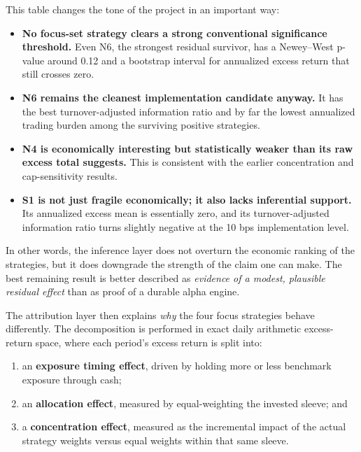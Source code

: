 \documentclass[conference]{IEEEtran}
\begin{document}
This table changes the tone of the project in an important way:
\begin{itemize}[leftmargin=1.4em]
    \item \textbf{No focus-set strategy clears a strong conventional significance threshold.} Even N6, the strongest residual survivor, has a Newey--West p-value around 0.12 and a bootstrap interval for annualized excess return that still crosses zero.
    \item \textbf{N6 remains the cleanest implementation candidate anyway.} It has the best turnover-adjusted information ratio and by far the lowest annualized trading burden among the surviving positive strategies.
    \item \textbf{N4 is economically interesting but statistically weaker than its raw excess total suggests.} This is consistent with the earlier concentration and cap-sensitivity results.
    \item \textbf{S1 is not just fragile economically; it also lacks inferential support.} Its annualized excess mean is essentially zero, and its turnover-adjusted information ratio turns slightly negative at the 10 bps implementation level.
\end{itemize}

In other words, the inference layer does not overturn the economic ranking of the strategies, but it does downgrade the strength of the claim one can make. The best remaining result is better described as \emph{evidence of a modest, plausible residual effect} than as proof of a durable alpha engine.

The attribution layer then explains \emph{why} the four focus strategies behave differently. The decomposition is performed in exact daily arithmetic excess-return space, where each period's excess return is split into:
\begin{enumerate}[leftmargin=1.4em]
    \item an \textbf{exposure timing effect}, driven by holding more or less benchmark exposure through cash;
    \item an \textbf{allocation effect}, measured by equal-weighting the invested sleeve; and
    \item a \textbf{concentration effect}, measured as the incremental impact of the actual strategy weights versus equal weights within that same sleeve.
\end{enumerate}
\end{document}
